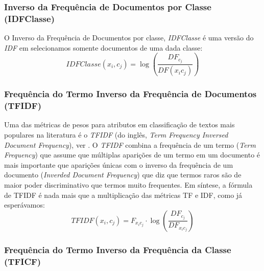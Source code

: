 
\subsubsection{Inverso da Frequência de Documentos por Classe (IDFClasse)}
\label{subsubsection::idf}

O Inverso da Frequência de Documentos por classe, \textit{IDFClasse} é uma versão do \textit{IDF} em selecionamos somente documentos de uma dada classe:
\begin{equation}\label{eqn::tficf}
   IDFClasse(x_i,c_j) = \log( \frac{DF_{c_j}} {DF(x_ic_j)} )
\end{equation}



\subsubsection{Frequência do Termo Inverso da Frequência de Documentos (TFIDF)}
\label{subsubsection::tfidf}

Uma das métricas de pesos para atributos em classificação de textos mais populares na literatura é o \textit{TFIDF} (do inglês, \textit{Term Frequency Inversed Document Frequency}), ver \cite{Salton88}. O \textit{TFIDF} combina a frequência de um termo (\textit{Term Frequency}) que assume que múltiplas aparições de um termo em um documento é mais importante que aparições únicas com o inverso da frequência de um documento (\textit{Inverded Document Frequency}) que diz que termos raros são de maior poder discriminativo que termos muito frequentes. Em síntese, a fórmula de TFIDF é nada mais que a multiplicação das métricas TF e IDF, como já esperávamos:
\begin{equation}\label{eqn::tficf}
   TFIDF(x_i, c_j) =  F_{x_ic_j} \cdot \log( \frac{DF_{c_j}}{ DF_{x_ic_j} } )
\end{equation}

\subsubsection{Frequência do Termo Inverso da Frequência da Classe (TFICF)}
\label{subsubsection::tficf}

